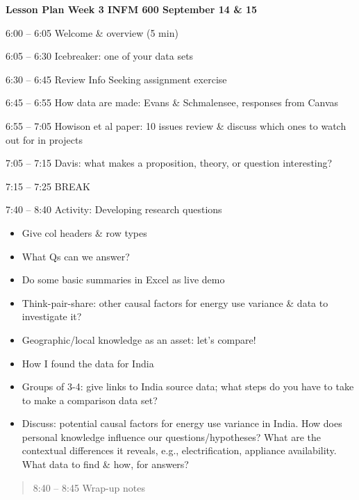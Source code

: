 \documentclass[]{article}
\date{}
\begin{document}
\textbf{Lesson Plan Week 3 INFM 600 September 14 \& 15}

6:00 -- 6:05 Welcome \& overview (5 min)

6:05 -- 6:30 Icebreaker: one of your data sets

6:30 -- 6:45 Review Info Seeking assignment exercise

6:45 -- 6:55 How data are made: Evans \& Schmalensee, responses from
Canvas

6:55 -- 7:05 Howison et al paper: 10 issues review \& discuss which ones
to watch out for in projects

7:05 -- 7:15 Davis: what makes a proposition, theory, or question
interesting?

7:15 -- 7:25 BREAK

7:40 -- 8:40 Activity: Developing research questions

\begin{itemize}
\item
  Give col headers \& row types
\item
  What Qs can we answer?
\item
  Do some basic summaries in Excel as live demo
\item
  Think-pair-share: other causal factors for energy use variance \& data
  to investigate it?
\item
  Geographic/local knowledge as an asset: let's compare!
\item
  How I found the data for India
\item
  Groups of 3-4: give links to India source data; what steps do you have
  to take to make a comparison data set?
\item
  Discuss: potential causal factors for energy use variance in India.
  How does personal knowledge influence our questions/hypotheses? What
  are the contextual differences it reveals, e.g., electrification,
  appliance availability. What data to find \& how, for answers?
\end{itemize}

\begin{quote}
8:40 -- 8:45 Wrap-up notes
\end{quote}
\end{document}

